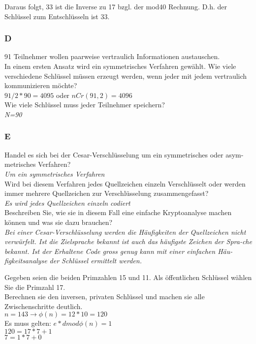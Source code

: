 Daraus folgt, 33 ist die Inverse zu 17 bzgl. der mod40 Rechnung. D.h. der Schlüssel zum Entschlüsseln ist 33.

\subsubsection{D}
91 Teilnehmer wollen paarweise vertraulich Informationen austauschen.\\

In einem ersten Ansatz wird ein symmetrisches Verfahren gewählt. 
Wie viele verschiedene Schlüssel müssen erzeugt werden, wenn jeder mit jedem vertraulich kommunizieren möchte?\\
$91/2*90=4095$ oder $nCr(91,2)=4096$\\

Wie viele Schlüssel muss jeder Teilnehmer speichern?\\
\textit{N=90}\\

\subsubsection{E}
Handel es sich bei der Cesar-Verschlüsselung um ein symmetrisches oder asym-metrisches Verfahren?\\
\textit{Um ein symmetrisches Verfahren}\\

Wird bei diesem Verfahren jedes Quellzeichen einzeln Verschlüsselt oder werden immer mehrere Quellzeichen zur Verschlüsselung zusammengefasst?\\
\textit{Es wird jedes Quellzeichen einzeln codiert}\\

Beschreiben Sie, wie sie in diesem Fall eine einfache Kryptoanalyse machen können und was sie dazu brauchen?\\
\textit{Bei einer Cesar-Verschlüsselung werden die Häufigkeiten der Quellzeichen nicht verwürfelt. Ist die Zielsprache bekannt ist auch das häufigste Zeichen der Spra-che bekannt. Ist der Erhaltene Code gross genug kann mit einer einfachen Häu-figkeitsanalyse der Schlüssel ermittelt werden.}\\

\columnbreak

Gegeben seien die beiden Primzahlen 15 und 11. Als öffentlichen Schlüssel wählen Sie die Primzahl 17.\\
Berechnen sie den inversen, privaten Schlüssel und machen sie alle Zwischenschritte deutlich.\\
$n = 143 \rightarrow \phi(n)=12*10=120$\\
Es muss gelten: $e*d mod \phi(n) = 1$\\
$120=17*7+1$\\
$7=1*7+0$\\

